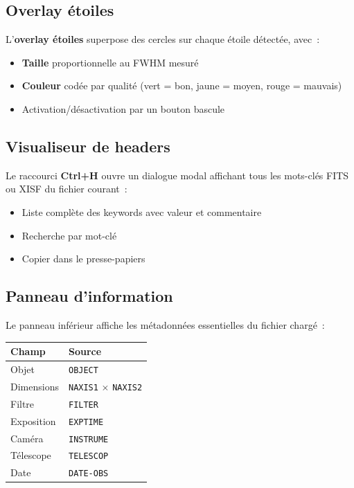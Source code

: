 \documentclass[a4paper,11pt]{article}
\begin{document}
\subsection{Overlay \'{e}toiles}

L'\textbf{overlay \'{e}toiles} superpose des cercles sur chaque \'{e}toile d\'{e}tect\'{e}e, avec~:

\begin{itemize}
    \item \textbf{Taille} proportionnelle au FWHM mesur\'{e}
    \item \textbf{Couleur} cod\'{e}e par qualit\'{e} (vert = bon, jaune = moyen, rouge = mauvais)
    \item Activation/d\'{e}sactivation par un bouton bascule
\end{itemize}

\subsection{Visualiseur de headers}

Le raccourci \textbf{Ctrl+H} ouvre un dialogue modal affichant tous les mots-cl\'{e}s FITS ou XISF du fichier courant~:

\begin{itemize}
    \item Liste compl\`{e}te des keywords avec valeur et commentaire
    \item Recherche par mot-cl\'{e}
    \item Copier dans le presse-papiers
\end{itemize}

\subsection{Panneau d'information}

Le panneau inf\'{e}rieur affiche les m\'{e}tadonn\'{e}es essentielles du fichier charg\'{e}~:

\begin{center}
\begin{tabularx}{0.85\textwidth}{l X}
\toprule
\textbf{Champ} & \textbf{Source} \\
\midrule
Objet & \texttt{OBJECT} \\
Dimensions & \texttt{NAXIS1} $\times$ \texttt{NAXIS2} \\
Filtre & \texttt{FILTER} \\
Exposition & \texttt{EXPTIME} \\
Cam\'{e}ra & \texttt{INSTRUME} \\
T\'{e}lescope & \texttt{TELESCOP} \\
Date & \texttt{DATE-OBS} \\
\bottomrule
\end{tabularx}
\end{center}
\end{document}
